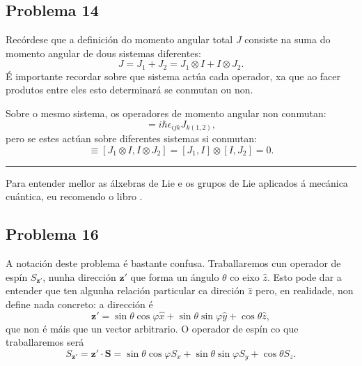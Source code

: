 \documentclass[a4paper,12pt]{article}
\begin{document}
\subsection*{Problema 14}

Recórdese que a definición do momento angular total $J$ consiste na suma do momento angular de dous sistemas diferentes:
\begin{equation}
	J = J_1 + J_2 = J_1 \otimes I + I \otimes J_2.
\end{equation}
\noindent
É importante recordar sobre que sistema actúa cada operador, xa que ao facer produtos entre eles esto determinará se conmutan ou non.

Sobre o mesmo sistema, os operadores de momento angular non conmutan:
\begin{equation}
	[J_{(1,2)i},J_{j(1,2)}] = i \hbar \epsilon_{ijk} J_{k(1,2)},
\end{equation}
\noindent
pero se estes actúan sobre diferentes sistemas si conmutan:
\begin{equation}
	[J_1,J_2] \equiv [J_1 \otimes I, I \otimes J_2] = [J_1,I] \otimes [I,J_2] = 0.
\end{equation}

\begin{center} \hrule \end{center}

Para entender mellor as álxebras de Lie e os grupos de Lie aplicados á mecánica cuántica, eu recomendo o libro \cite{Woit}.

\subsection*{Problema 16}

A notación deste problema é bastante confusa. Traballaremos cun operador de espín $S_{\textbf{z}'}$, nunha dirección $\textbf{z}'$ que forma un ángulo $\theta$ co eixo $\hat{z}$. Esto pode dar a entender que ten algunha relación particular ca direción $\hat{z}$ pero, en realidade, non define nada concreto: a dirección é
\begin{equation}
	\textbf{z}' = \sin \theta \cos \varphi \hat{x} + \sin \theta \sin \varphi \hat{y} + \cos \theta \hat{z},
\end{equation}
\noindent
que non é máis que un vector arbitrario. O operador de espín co que traballaremos será
\begin{equation}
	S_{\textbf{z}'} = \textbf{z}' \cdot \textbf{S} = \sin \theta \cos \varphi S_x + \sin \theta \sin \varphi S_y + \cos \theta S_z.
\end{equation}
\end{document}
